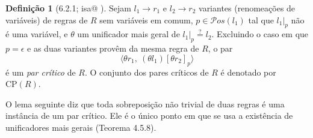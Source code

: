 \documentclass[a4paper]{article}
\makeatletter
\newcommand{\pos}[1]{\mathcal{P}os(#1)}
\newcommand{\termpos}[1]{|_{#1}}
\newcommand{\subpos}[2]{[#1]_{#2}}
\newcommand{\CP}[1]{\mathrm{CP}(#1)}
\newcommand{\isa}[1]{\textup{%
  \ifcsname isa@\detokenize{#1}\endcsname
    \href{\csname isa@\detokenize{#1}\endcsname}{\texttt{\detokenize{#1}}}%
  \else
    \texttt{\detokenize{#1}}%
  \fi}}
\theoremstyle{definition}
\newtheorem{definition}{Definição}
\theoremstyle{plain}
\makeatother
\begin{document}
	\begin{definition}[6.2.1; \isa{CP}]
		Sejam \(l_1 \rightarrow r_1\) e \(l_2 \rightarrow r_2\) variantes (renomeações de variáveis) de regras de \(R\) sem variáveis em comum, \(p \in \pos{l_1}\) tal que \(l_1\termpos{p}\) não é uma variável, e \(\theta\) um unificador mais geral de \(l_1\termpos{p} \stackrel{?}{=} l_2\). Excluindo o caso em que \(p = \epsilon\) e as duas variantes provêm da mesma regra de \(R\), o par
			\[\langle \theta r_1,\ (\theta l_1)\subpos{\theta r_2}{p} \rangle\]
		é um {\em par crítico} de \(R\). O conjunto dos pares críticos de \(R\) é denotado por \(\CP{R}\).
	\end{definition}

	O lema seguinte diz que toda sobreposição não trivial de duas regras é uma instância de um par crítico. Ele é o único ponto em que se usa a existência de unificadores mais gerais (Teorema 4.5.8).
\end{document}

